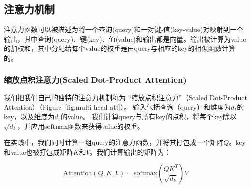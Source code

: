 \subsection{注意力机制} \label{sec:attention}

注意力函数可以被描述为将一个查询(query)和一对键-值(key-value)对映射到一个输出，其中查询(query)、键(key)、值(value)和输出都是向量。输出被计算为value的加权和，其中分配给每个value的权重是由query与相应的key的相似函数计算的。

\subsubsection{缩放点积注意力(Scaled Dot-Product Attention)} \label{sec:scaled-dot-prod}



我们把我们自己的独特的注意力机制称为 “缩放点积注意力”（Scaled Dot-Product Attention）（Figure~\ref{fig:multi-head-att}）。 输入包括查询（query）和维度为$d_k$的key，以及维度为$d_v$的value。 我们计算query与所有key的点积，将每个key除以$\sqrt{d_k}$，并应用softmax函数来获得value的权重。


在实践中，我们同时计算一组query的注意力函数，并将其打包成一个矩阵$Q$。key和value也被打包成矩阵$K$和$V$。我们计算输出的矩阵为：

\begin{equation}
   \mathrm{Attention}(Q, K, V) = \mathrm{softmax}\left(\frac{QK^T}{\sqrt{d_k}}\right)V
\end{equation}


